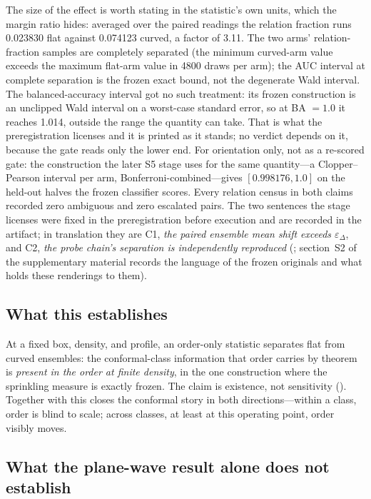 The size of the effect is worth stating in the statistic's own units, which
the margin ratio hides: averaged over the paired readings the relation
fraction runs 0.023830 flat against 0.074123 curved, a factor of 3.11. The
two arms' relation-fraction samples are completely separated (the minimum
curved-arm value exceeds the maximum flat-arm value in 4800 draws per arm);
the AUC interval at complete separation is the frozen exact bound, not the
degenerate Wald interval. The balanced-accuracy interval got no such
treatment: its frozen construction is an unclipped Wald interval on a
worst-case standard error, so at BA $= 1.0$ it reaches 1.014, outside the
range the quantity can take. That is what the preregistration licenses and it
is printed as it stands; no verdict depends on it, because the gate reads only
the lower end. For orientation only, not as a re-scored gate: the
construction the later S5 stage uses for the same quantity---a
Clopper--Pearson interval per arm, Bonferroni-combined---gives
$[0.998176, 1.0]$ on the held-out halves the frozen classifier scores.
Every relation census in both
claims recorded zero
ambiguous and zero escalated pairs. The two sentences the stage licenses were
fixed in the preregistration before execution and are recorded in the
artifact; in translation they are C1, \emph{the paired ensemble mean shift
exceeds $\varepsilon_\Delta$}, and C2, \emph{the probe chain's separation is
independently reproduced}
(;
section~S2 of the supplementary material records the language of the
frozen originals
and what holds these renderings to them).

\subsection{What this establishes}
\label{sec:establishes}

At a fixed box, density, and profile, an order-only statistic separates flat
from curved ensembles: the conformal-class information that order carries by
theorem is \emph{present in the order at finite density}, in the one
construction where the sprinkling measure is exactly frozen. The claim is
existence, not sensitivity (). Together with
 this
closes the conformal story in both directions---within a class, order is
blind to scale; across classes, at least at this operating point, order
visibly moves.

\subsection{What the plane-wave result alone does not establish}
\label{sec:notestablish}

